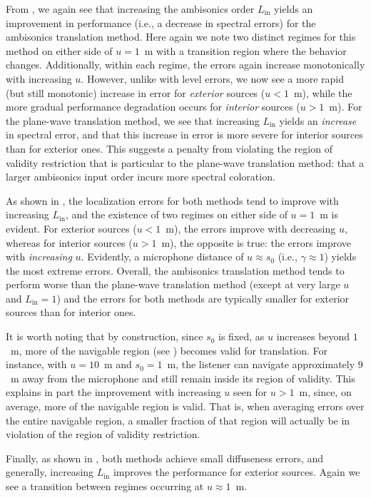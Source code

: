 From , we again see that increasing the ambisonics order $L_\text{in}$ yields an improvement in performance (i.e., a decrease in spectral errors) for the ambisonics translation method.
Here again we note two distinct regimes for this method on either side of $u = 1$~m with a transition region where the behavior changes.
Additionally, within each regime, the errors again increase monotonically with increasing $u$.
However, unlike with level errors, we now see a more rapid (but still monotonic) increase in error for \textit{exterior} sources ($u < 1$~m), while the more gradual performance degradation occurs for \textit{interior} sources ($u > 1$~m).
For the plane-wave translation method, we see that increasing $L_\text{in}$ yields an \textit{increase} in spectral error, and that this increase in error is more severe for interior sources than for exterior ones.
This suggests a penalty from violating the region of validity restriction that is particular to the plane-wave translation method: that a larger ambisonics input order incurs more spectral coloration.

As shown in , the localization errors for both methods tend to improve with increasing $L_\text{in}$, and the existence of two regimes on either side of $u = 1$~m is evident.
For exterior sources ($u < 1$~m), the errors improve with decreasing $u$, whereas for interior sources ($u > 1$~m), the opposite is true: the errors improve with \textit{increasing} $u$.
Evidently, a microphone distance of $u \approx s_0$ (i.e., $\gamma \approx 1$) yields the most extreme errors.
Overall, the ambisonics translation method tends to perform worse than the plane-wave translation method (except at very large $u$ and $L_\text{in} = 1$) and the errors for both methods are typically smaller for exterior sources than for interior ones.

It is worth noting that by construction, since $s_0$ is fixed, as $u$ increases beyond $1$~m, more of the navigable region (see ) becomes valid for translation.
For instance, with $u = 10$~m and $s_0 = 1$~m, the listener can navigate approximately $9$~m away from the microphone and still remain inside its region of validity.
This explains in part the improvement with increasing $u$ seen for $u > 1$~m, since, on average, more of the navigable region is valid.
That is, when averaging errors over the entire navigable region, a smaller fraction of that region will actually be in violation of the region of validity restriction.

Finally, as shown in , both methods achieve small diffuseness errors, and generally, increasing $L_\text{in}$ improves the performance for exterior sources.
Again we see a transition between regimes occurring at $u \approx 1$~m.